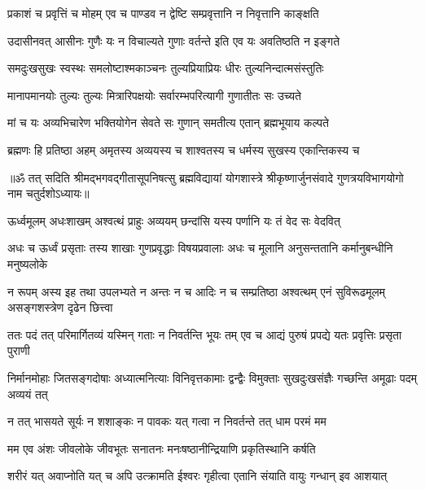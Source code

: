 
\twolineshloka
{प्रकाशं च प्रवृत्तिं च मोहम् एव च पाण्डव}
{न द्वेष्टि सम्प्रवृत्तानि न निवृत्तानि काङ्क्षति}%

\twolineshloka
{उदासीनवत् आसीनः गुणैः यः न विचाल्यते}
{गुणाः वर्तन्ते इति एव यः अवतिष्ठति न इङ्गते}%

\twolineshloka
{समदुःखसुखः स्वस्थः समलोष्टाश्मकाञ्चनः}
{तुल्यप्रियाप्रियः धीरः तुल्यनिन्दात्मसंस्तुतिः}%

\twolineshloka
{मानापमानयोः तुल्यः तुल्यः मित्रारिपक्षयोः}
{सर्वारम्भपरित्यागी गुणातीतः सः उच्यते}%

\twolineshloka
{मां च यः अव्यभिचारेण भक्तियोगेन सेवते}
{सः गुणान् समतीत्य एतान् ब्रह्मभूयाय कल्पते}%

\twolineshloka
{ब्रह्मणः हि प्रतिष्ठा अहम् अमृतस्य अव्ययस्य च}
{शाश्वतस्य च धर्मस्य सुखस्य एकान्तिकस्य च}%

{॥ॐ तत् सदिति श्रीमद्भगवद्गीतासूपनिषत्सु ब्रह्मविद्यायां योगशास्त्रे श्रीकृष्णार्जुनसंवादे गुणत्रयविभागयोगो नाम चतुर्दशोऽध्यायः॥}



\twolineshloka
{ऊर्ध्वमूलम् अधःशाखम् अश्वत्थं प्राहुः अव्ययम्}
{छन्दांसि यस्य पर्णानि यः तं वेद सः वेदवित्}%

\fourlineindentedshloka
{अधः च ऊर्ध्वं प्रसृताः तस्य शाखाः}
{गुणप्रवृद्धाः विषयप्रवालाः}
{अधः च मूलानि अनुसन्ततानि}
{कर्मानुबन्धीनि मनुष्यलोके}%

\fourlineindentedshloka
{न रूपम् अस्य इह तथा उपलभ्यते}
{न अन्तः न च आदिः न च सम्प्रतिष्ठा}
{अश्वत्थम् एनं सुविरूढमूलम्}
{असङ्गशस्त्रेण दृढेन छित्त्वा}%

\fourlineindentedshloka
{ततः पदं तत् परिमार्गितव्यं}
{यस्मिन् गताः न निवर्तन्ति भूयः}
{तम् एव च आद्यं पुरुषं प्रपद्ये}
{यतः प्रवृत्तिः प्रसृता पुराणी}%

\fourlineindentedshloka
{निर्मानमोहाः जितसङ्गदोषाः}
{अध्यात्मनित्याः विनिवृत्तकामाः}
{द्वन्द्वैः विमुक्ताः सुखदुःखसंज्ञैः}
{गच्छन्ति अमूढाः पदम् अव्ययं तत्}%

\twolineshloka
{न तत् भासयते सूर्यः न शशाङ्कः न पावकः}
{यत् गत्वा न निवर्तन्ते तत् धाम परमं मम}%

\twolineshloka
{मम एव अंशः जीवलोके जीवभूतः सनातनः}
{मनःषष्ठानीन्द्रियाणि प्रकृतिस्थानि कर्षति}%

\twolineshloka
{शरीरं यत् अवाप्नोति यत् च अपि उत्क्रामति ईश्वरः}
{गृहीत्वा एतानि संयाति वायुः गन्धान् इव आशयात्}%

